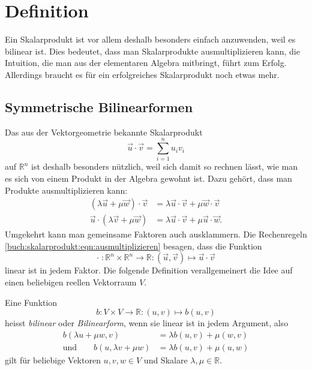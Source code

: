 %
%
%
\section{Definition
\label{buch:skalarprodukte:section:definition}}
Ein Skalarprodukt ist vor allem deshalb besonders einfach anzuwenden,
weil es bilinear ist.
Dies bedeutet, dass man Skalarprodukte ausmultiplizieren kann, die
Intuition, die man aus der elementaren Algebra mitbringt, führt zum
Erfolg.
Allerdings braucht es für ein erfolgreiches Skalarprodukt noch
etwas mehr.

%
%
\subsection{Symmetrische Bilinearformen}
Das aus der Vektorgeometrie bekannte Skalarprodukt
%
%
\[
\vec{u}\cdot \vec{v}
=
\sum_{i=1}^n u_iv_i
\]
auf $\mathbb{R}^n$ ist deshalb besonders nützlich, weil sich damit
so rechnen lässt, wie man es sich von einem Produkt in der Algebra
gewohnt ist.
Dazu gehört, dass man Produkte ausmultiplizieren kann:
\begin{equation}
\begin{aligned}
(\lambda\vec{u}+\mu\vec{w})\cdot\vec{v}
&=
\lambda\vec{u}\cdot\vec{v}+\mu\vec{w}\cdot\vec{v}
\\
\vec{u}\cdot(\lambda\vec{v}+\mu\vec{w})
&=
\lambda\vec{u}\cdot\vec{v}+\mu\vec{u}\cdot\vec{w}.
\end{aligned}
\label{buch:skalarprodukt:eqn:ausmultiplizieren}
\end{equation}
Umgekehrt kann man gemeinsame Faktoren auch ausklammern.
Die Rechenregeln \eqref{buch:skalarprodukt:eqn:ausmultiplizieren}
besagen, dass die Funktion
\[
\cdot
\;
\colon
\mathbb{R}^n \times \mathbb{R}^n
\to
\mathbb{R}
:
(\vec{u},\vec{v}) \mapsto \vec{u}\cdot\vec{v}
\]
linear ist in jedem Faktor.
Die folgende Definition verallgemeinert die Idee auf einen
beliebigen reellen Vektorraum $V$.

\begin{definition}
Eine Funktion
\[
b\colon
V\times V \to \mathbb{R}
:
(u,v) \mapsto b(u,v)
\]
heisst {\em bilinear} oder {\em Bilinearform},
wenn sie linear ist in jedem Argument, also
%
%
\[
\begin{aligned}
b(\lambda u+\mu w,v) &= \lambda b(u,v) + \mu(w,v)
\\
\text{und}\qquad
b(u,\lambda v+\mu w) &= \lambda b(u,v) + \mu(u,w)
\end{aligned}
\]
gilt für beliebige Vektoren $u,v,w\in V$ und Skalare
$\lambda,\mu\in\mathbb{R}$.
\end{definition}

